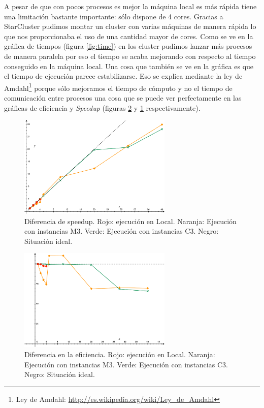 \documentclass{article}
\begin{document}
	A pesar de que con pocos procesos es mejor la máquina local es más rápida tiene una limitación bastante importante: sólo dispone de 4 cores. Gracias a StarCluster pudimos montar un cluster con varias máquinas de manera rápida lo que nos proporcionaba el uso de una cantidad mayor de cores. Como se ve en la gráfica de tiempos (figura \ref{fig:time}) en los cluster pudimos lanzar más procesos de manera paralela por eso el tiempo se acaba mejorando con respecto al tiempo conseguido en la máquina local. Una cosa que también se ve en la gráfica es que el tiempo de ejecución parece estabilizarse. Eso se explica mediante la ley de Amdahl\footnote{Ley de Amdahl: \url{http://es.wikipedia.org/wiki/Ley_de_Amdahl}} porque sólo mejoramos el tiempo de cómputo y no el tiempo de comunicación entre procesos una cosa que se puede ver perfectamente en las gráficas de eficiencia y \emph{Speedup} (figuras \ref{fig:eficiencia} y \ref{fig:speedup} respectivamente).


\begin{figure}[h]
  \centering
    \includegraphics[width=0.65\textwidth]{img/speedup.pdf}
  \caption{Diferencia de speedup. Rojo: ejecución en Local. Naranja: Ejecución con instancias M3. Verde: Ejecución con instancias C3. Negro: Situación ideal.}
  \label{fig:speedup}
\end{figure}

\begin{figure}[h]
  \centering
    \includegraphics[width=0.65\textwidth]{img/eficiencia.pdf}
  \caption{Diferencia en la eficiencia. Rojo: ejecución en Local. Naranja: Ejecución con instancias M3. Verde: Ejecución con instancias C3. Negro: Situación ideal.}
  \label{fig:eficiencia}
\end{figure}
\end{document}
